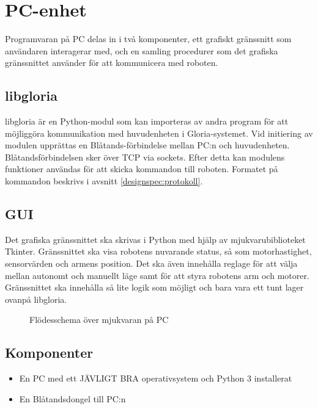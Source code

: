 \section{PC-enhet}
Programvaran på PC delas in i två komponenter, ett grafiskt gränssnitt som användaren interagerar med, och en samling procedurer som det grafiska gränssnittet använder för att kommunicera med roboten. 

\subsection{libgloria}
libgloria är en Python-modul som kan importeras av andra program för att möjliggöra kommunikation med huvudenheten i Gloria-systemet. Vid initiering av modulen upprättas en Blåtands-förbindelse mellan PC:n och huvudenheten. Blåtandsförbindelsen sker över TCP via sockets. Efter detta kan modulens funktioner användas för att skicka kommandon till roboten. Formatet på kommandon beskrivs i avsnitt \ref{designspec:protokoll}.

\subsection{GUI}
Det grafiska gränssnittet ska skrivas i Python med hjälp av mjukvarubiblioteket Tkinter. Gränssnittet ska visa robotens nuvarande status, så som motorhastighet, sensorvärden och armens position. Det ska även innehålla reglage för att välja mellan autonomt och manuellt läge samt för att styra robotens arm och motorer. Gränssnittet ska innehålla så lite logik som möjligt och bara vara ett tunt lager ovanpå libgloria.

\begin{figure}[h]
  \centerline{}
  \caption{Flödesschema över mjukvaran på PC}
\end{figure}

\subsection{Komponenter}
\begin{itemize}
\item En PC med ett JÄVLIGT BRA operativsystem och Python 3 installerat
\item En Blåtandsdongel till PC:n
\end{itemize}
